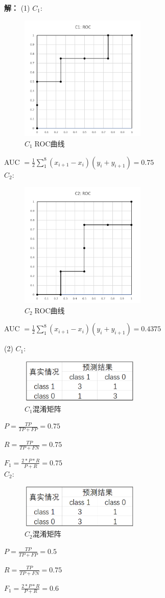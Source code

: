 \documentclass{article}
\begin{document}
	\begin{spacing}{2.0}
	\textbf{解：}
	(1)
	$C_1$:
	\begin{figure}[H]
		\centering
		\includegraphics[width=6cm,height=6cm]{c1-roc.PNG}
		\caption{$C_1\;$ROC曲线}
	\end{figure}
	
	AUC
	$=\frac{1}{2}\sum_1^8(x_{i+1}-x_i)(y_i+y_{i+1})
	=0.75$\\

	$C_2$:
	\begin{figure}[H]
		\centering
		\includegraphics[width=6cm,height=6cm]{c2-roc.PNG}
		\caption{$C_2\;$ROC曲线}
	\end{figure}

	AUC
	$=\frac{1}{2}\sum_1^8(x_{i+1}-x_i)(y_i+y_{i+1})
	=0.4375$


	(2) 
	$C_1$:
	\begin{figure}[H]
		\centering
		\includegraphics[width=5.7cm,height=2.1cm]{c1-cm.PNG}
		\caption{$C_1$混淆矩阵}
	\end{figure}

	$P=\frac{TP}{TP+FP}=0.75$

	$R=\frac{TP}{TP+FN}=0.75$

	$F_1=\frac{2*P*R}{P+R}=0.75$\\

	$C_2$:
	\begin{figure}[H]
		\centering
		\includegraphics[width=5.7cm,height=2.1cm]{c2-cm.PNG}
		\caption{$C_2$混淆矩阵}
	\end{figure}

	$P=\frac{TP}{TP+FP}=0.5$

	$R=\frac{TP}{TP+FN}=0.75$

	$F_1=\frac{2*P*R}{P+R}=0.6$
	\end{spacing}

	
\end{document}
